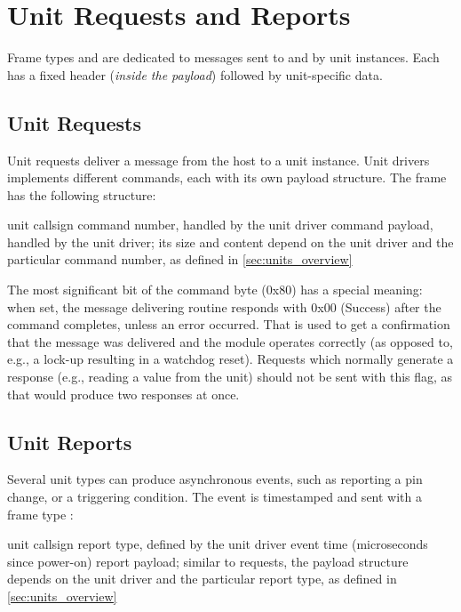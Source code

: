 \section{Unit Requests and Reports} \label{sec:unit_requests_reports}

Frame types \CmdUnitRequest and \CmdUnitReport are dedicated to messages sent to and by unit instances. Each has a fixed header (\textit{inside the payload}) followed by unit-specific data.

\subsection{Unit Requests}\label{sec:unit_requests_format}

Unit requests deliver a message from the host to a unit instance. Unit drivers implements different commands, each with its own payload structure. The frame \CmdUnitRequest has the following structure:

\begin{boxedpayload}
	 unit callsign
	 command number, handled by the unit driver
	 command payload, handled by the unit driver; its size and content depend on the unit driver and the particular command number, as defined in \cref{sec:units_overview}
\end{boxedpayload}

The most significant bit of the command byte (0x80) has a special meaning: when set, the message delivering routine responds with 0x00 (Success) after the command completes, unless an error occurred. That is used to get a confirmation that the message was delivered and the module operates correctly (as opposed to, e.g., a lock-up resulting in a watchdog reset). Requests which normally generate a response (e.g., reading a value from the unit) should not be sent with this flag, as that would produce two responses at once.

\subsection{Unit Reports}\label{sec:unit_reports_format}

Several unit types can produce asynchronous events, such as reporting a pin change, or a triggering condition. The event is timestamped and sent with a frame type \CmdUnitReport:

\begin{boxedpayload}
	 unit callsign
	 report type, defined by the unit driver
	 event time (microseconds since power-on)
	 report payload; similar to requests, the payload structure depends on the unit driver and the particular report type, as defined in \cref{sec:units_overview}
\end{boxedpayload}

















